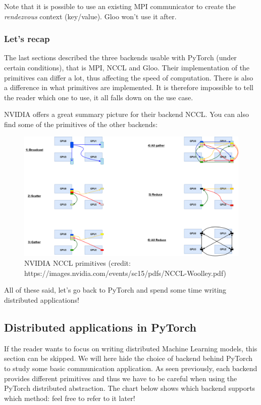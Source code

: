\documentclass{article}
\begin{document}
Note that it is possible to use an existing MPI communicator to create the \emph{rendezvous} context (key/value). Gloo won't use it after.

\subsubsection{Let's recap}
The last sections described the three backends usable with PyTorch (under certain conditions), that is MPI, NCCL and Gloo. Their implementation of the primitives can differ a lot, thus affecting the speed of computation. There is also a difference in what primitives are implemented. It is therefore impossible to tell the reader which one to use, it all falls down on the use case.

NVIDIA offers a great summary picture for their backend NCCL. You can also find some of the primitives of the other backends:

\begin{figure}[h!]
  \center
  \includegraphics[width=0.7\linewidth]{images/2022-09-07-15-00-16.png}
  \caption{NVIDIA NCCL primitives (credit: https://images.nvidia.com/events/sc15/pdfs/NCCL-Woolley.pdf)}
\end{figure}
\FloatBarrier

All of these said, let's go back to PyTorch and spend some time writing distributed applications!

\subsection{Distributed applications in PyTorch}
If the reader wants to focus on writing distributed Machine Learning models, this section can be skipped. We will here hide the choice of backend behind PyTorch to study some basic communication application. As seen previously, each backend provides different primitives and thus we have to be careful when using the PyTorch distributed abstraction. The chart below shows which backend supports which method: feel free to refer to it later!
\end{document}
